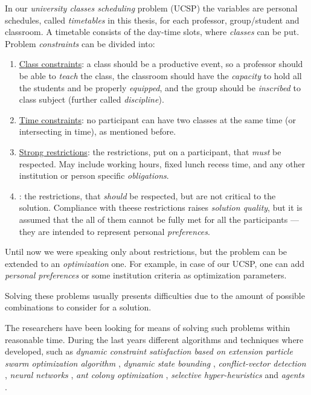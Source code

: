 In our \emph{university classes scheduling} problem (UCSP) the variables
are personal schedules, called \emph{timetables} in this thesis,
for each professor, group/student and classroom. A timetable consists
of the day-time slots, where \emph{classes} can be put.
Problem \emph{constraints} can be divided into:
\begin{enumerate}
  \item \underline{Class constraints}: a class should be a productive event, so
    a professor should be able to \emph{teach} the class, the classroom should
    have the \emph{capacity} to hold all the students and be properly \emph{equipped},
    and the group should be \emph{inscribed} to class subject
    (further called \emph{discipline}).
  \item \underline{Time constraints}: no participant can have two classes
    at the same time (or intersecting in time), as mentioned before.
  \item \underline{Strong restrictions}: the restrictions, put on a participant, that
    \emph{must} be respected. May include working hours, fixed lunch recess time,
    and any other institution or person specific \emph{obligations}.
  \item {}: the restrictions, that \emph{should} be respected,
    but are not critical to the solution. Compliance with theese restrictions
    raises \emph{solution quality}, but it is assumed that the all of them
    cannot be fully met for all the participants --- they are intended to
    represent personal \emph{preferences}.
\end{enumerate}

\bigskip
Until now we were speaking only about restrictions, but the problem can
be extended to an \emph{optimization} one. For example, in case of our UCSP,
one can add \emph{personal preferences} or some institution criteria as
optimization parameters. \todo{}




\bigskip
\noindent
Solving these problems usually presents difficulties due to the amount of
possible combinations to consider for a solution.

\todo

\bigskip
\noindent

The researchers have been looking for means of solving such
problems within reasonable time.
During the last years different algorithms and techniques where developed,
such as
\emph{dynamic constraint satisfaction based on extension particle swarm
      optimization algorithm} \cite{CSPswarm},
\emph{dynamic state bounding} \cite{CSPdynStateBound},
\emph{conflict-vector detection} \cite{CSPtimetable},
\emph{neural networks} \cite{CSPneuro},
\emph{ant colony optimization} \cite{CSPcunningACO, CSPlimmemACO},
\emph{selective hyper-heuristics} \cite{CSPhypHeur}
and \emph{agents} \cite{CSPagent2013, CSPagent2014, DCSPagent1998}.


